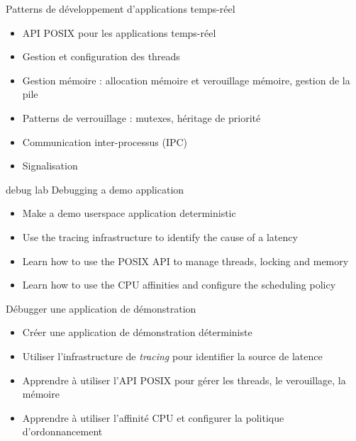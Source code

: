 {Patterns de développement d'applications temps-réel}
{
  \begin{itemize}
  \item API POSIX pour les applications temps-réel
  \item Gestion et configuration des threads
  \item Gestion mémoire : allocation mémoire et verouillage mémoire, gestion de la pile
  \item Patterns de verrouillage : mutexes, héritage de priorité
  \item Communication inter-processus (IPC)
  \item Signalisation
  \end{itemize}
}
{debug}
{lab}
{Debugging a demo application}
{
  \begin{itemize}
  \item Make a demo userspace application deterministic
  \item Use the tracing infrastructure to identify the cause of a latency
  \item Learn how to use the POSIX API to manage threads, locking and memory
  \item Learn how to use the CPU affinities and configure the scheduling policy
  \end{itemize}
}
{Débugger une application de démonstration}
{
  \begin{itemize}
  \item Créer une application de démonstration déterministe
  \item Utiliser l'infrastructure de {\em tracing} pour identifier la source de latence
  \item Apprendre à utiliser l'API POSIX pour gérer les threads, le verouillage, la mémoire
  \item Apprendre à utiliser l'affinité CPU et configurer la politique d'ordonnancement
  \end{itemize}
}

\def \onlineagenda {
  \showagendaday{1}
  \showagendaitem{intro}{lecture}
  \showagendaitem{preemptrtpatch}{lecture}
  \showagendaitem{buildkernel}{lab}
  \showagendaitem{configuration}{lecture}
  \showagendaday{2}
  \showagendaitem{tools}{lecture}
  \showagendaitem{tools}{lab}
  \showagendaitem{kernelinfrastructure}{lecture}
  \showagendaday{3}
  \showagendaitem{realtime}{lecture}
  \showagendaitem{debug}{lab}
  \showagendaitem{qna}{misc}
}
\def \onsiteagenda {
  \showagendaday{1}
  \showagendaitem{intro}{lecture}
  \showagendaitem{preemptrtpatch}{lecture}
  \showagendaitem{buildkernel}{lab}
  \showagendaday{2}
  \showagendaitem{configuration}{lecture}
  \showagendaitem{tools}{lecture}
  \showagendaitem{tools}{lab}
  \showagendaday{3}
  \showagendaitem{kernelinfrastructure}{lecture}
  \showagendaitem{realtime}{lecture}
  \showagendaday{4}
  \showagendaitem{debug}{lab}
  \showagendaitem{qna}{misc}
}
